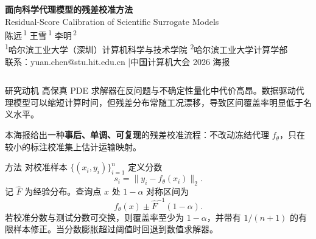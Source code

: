 \documentclass[final,t]{beamer}
\newlength{\colwidth}
\begin{document}
\begin{frame}[t]

\vspace*{-0.4cm}
\begin{center}
  {\color{white}\fontsize{56}{64}\selectfont\bfseries
  面向科学代理模型的残差校准方法}\\[0.55cm]
  {\color{white}\fontsize{32}{40}\selectfont
  Residual-Score Calibration of Scientific Surrogate Models}\\[0.7cm]
  {\color{white}\fontsize{24}{30}\selectfont
  陈远\,\textsuperscript{1} \quad 王雪\,\textsuperscript{1} \quad 李明\,\textsuperscript{2}}\\[0.35cm]
  {\color{white!88}\fontsize{20}{26}\selectfont
  \textsuperscript{1}哈尔滨工业大学（深圳）计算机科学与技术学院 \quad
  \textsuperscript{2}哈尔滨工业大学计算学部}\\[0.2cm]
  {\color{hitlightblue}\fontsize{18}{22}\selectfont
  联系：yuan.chen@stu.hit.edu.cn \quad|\quad 中国计算机大会 2026 海报}
\end{center}

\vspace{1.5cm}

\begin{columns}[t]
\begin{column}{\colwidth}
\begin{block}{研究动机}
高保真 PDE 求解器在反问题与不确定性量化中代价高昂。数据驱动代理模型可以缩短计算时间，但残差分布常随工况漂移，导致区间覆盖率明显低于名义水平。

\vspace{0.35em}
本海报给出一种\textbf{事后、单调、可复现}的残差校准流程：不改动冻结代理 $f_\theta$，只在较小的标注校准集上估计运输映射。
\end{block}

\begin{block}{方法}
对校准样本 $\{(x_i,y_i)\}_{i=1}^{n}$ 定义分数
\[
  s_i=\|y_i-f_\theta(x_i)\|_2.
\]
记 $\hat F$ 为经验分布。查询点 $x$ 处 $1-\alpha$ 对称区间为
\[
  f_\theta(x)\pm \hat F^{-1}(1-\alpha).
\]
若校准分数与测试分数可交换，则覆盖率至少为 $1-\alpha$，并带有 $1/(n+1)$ 的有限样本修正。当分数膨胀超过阈值时回退到数值求解器。
\end{block}
\end{column}


\end{columns}
\end{frame}
\end{document}
